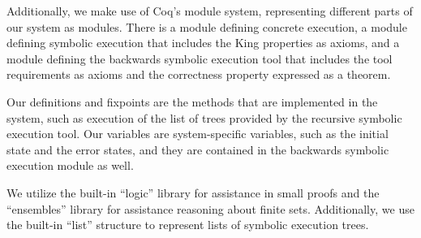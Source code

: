 
 

Additionally, we make use of Coq's module system, representing different parts of our system as modules.  There is a module defining concrete execution, a module defining symbolic execution that includes the King properties as axioms, and a module defining the backwards symbolic execution tool that includes the tool requirements as axioms and the correctness property expressed as a theorem.

Our definitions and fixpoints are the methods that are implemented
in the system, such as execution of the list of trees provided by the recursive
symbolic execution tool. Our variables are system-specific variables, such as the
initial state and the error states, and they are contained in the backwards symbolic execution module as well.

We utilize the built-in ``logic'' library for assistance in small proofs and the ``ensembles'' library for assistance reasoning about finite sets. Additionally, we use the built-in ``list'' structure to represent lists of symbolic execution trees.








